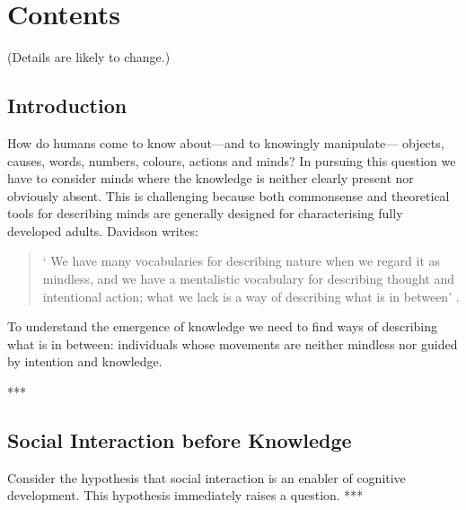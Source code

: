 \documentclass[12pt,\papersize]{extarticle}
\begin{document}
\section{Contents}
(Details are likely to change.)


\subsection{Introduction}
How do humans come to know  about---and to knowingly manipulate---%
objects,
causes,
words,
numbers,
colours,
actions
and
minds?
In pursuing this question we have to consider minds where the knowledge is neither clearly present nor obviously absent. 
This is challenging because both commonsense and theoretical tools for describing minds are generally designed for characterising fully developed adults. 
Davidson writes:
%
\begin{quote}
`%
We have many vocabularies for describing nature when we regard it as mindless, and we have a mentalistic vocabulary for describing thought and intentional action; what we lack is a way of describing what is in between' \citep[p.\ 11]{Davidson:1999ju}.
\end{quote}
%
%
To understand the emergence of knowledge we need to find ways of describing what is in between: individuals whose movements are neither mindless nor guided by intention and knowledge.  

***


\subsection{Social Interaction before Knowledge}
Consider the hypothesis that social interaction is an enabler of cognitive development. 
This hypothesis immediately raises a question. 
***
\end{document}
